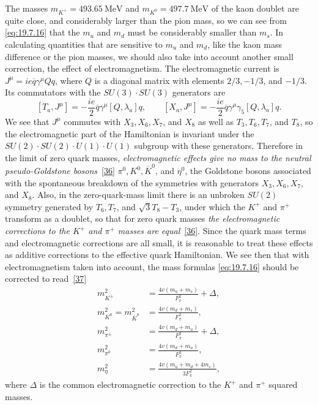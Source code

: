 The masses $m_{K^+}=493.65\ \mathrm{MeV}$ and $m_{K^0}=497.7\ \mathrm{MeV}$ of the kaon doublet are quite close, and considerably larger than the pion mass, so we can see from \eqref{eq:19.7.16} that the $m_u$ and $m_d$ must be considerably smaller than $m_s$. In calculating quantities that are sensitive to $m_u$ and $m_d$, like the kaon mass difference or the pion masses, we should also take into account another small correction, the effect of electromagnetism. The electromagnetic current is $J^\mu=ie\overline q\gamma^\mu Qq$, where $Q$ is a diagonal matrix with elements $2/3,-1/3$, and $-1/3$. Its commutators with the $SU(3)\cdot SU(3)$ generators are
\[
[T_a,J^\mu]
=-\frac{ie}{2}\overline q\gamma^\mu[Q,\lambda_a]q,
\qquad
[X_a,J^\mu]
=-\frac{ie}{2}\overline q\gamma^\mu\gamma_5[Q,\lambda_a]q.
\]
We see that $J^\mu$ commutes with $X_3,X_6,X_7$, and $X_8$ as well as $T_3,T_6,T_7$, and $T_8$, so the electromagnetic part of the Hamiltonian is invariant under the $SU(2)\cdot SU(2)\cdot U(1)\cdot U(1)$ subgroup with these generators. Therefore in the limit of zero quark masses, \emph{electromagnetic effects give no mass to the neutral pseudo-Goldstone bosons}~\hyperref[ch19-ref-36]{[36]} $\pi^0,K^0,\overline K^0$, and $\eta^0$, the Goldstone bosons associated with the spontaneous breakdown of the symmetries with generators $X_3,X_6,X_7$, and $X_8$. Also, in the zero-quark-mass limit there is an unbroken $SU(2)$ symmetry generated by $T_6,T_7$, and $\sqrt3T_8-T_3$, under which the $K^+$ and $\pi^+$ transform as a doublet, so that for zero quark masses \emph{the electromagnetic corrections to the $K^+$ and $\pi^+$ masses are equal}~\hyperref[ch19-ref-36]{[36]}. Since the quark mass terms and electromagnetic corrections are all small, it is reasonable to treat these effects as additive corrections to the effective quark Hamiltonian. We see then that with electromagnetism taken into account, the mass formulas \eqref{eq:19.7.16} should be corrected to read~\hyperref[ch19-ref-37]{[37]}
\begin{equation}
\begin{aligned}
m_{K^\pm}^2
&=\frac{4v(m_u+m_s)}{F_\pi^2}+\Delta,\\
m_{K^0}^2=m_{\overline K^0}^2
&=\frac{4v(m_d+m_s)}{F_\pi^2},\\
m_{\pi^\pm}^2
&=\frac{4v(m_d+m_u)}{F_\pi^2}+\Delta,\\
m_{\pi^0}^2
&=\frac{4v(m_d+m_u)}{F_\pi^2},\\
m_\eta^2
&=\frac{4v(m_u+m_d+4m_s)}{3F_\pi^2},
\end{aligned}
\tag{19.7.20}\label{eq:19.7.20}
\end{equation}
where $\Delta$ is the common electromagnetic correction to the $K^+$ and $\pi^+$ squared masses.

